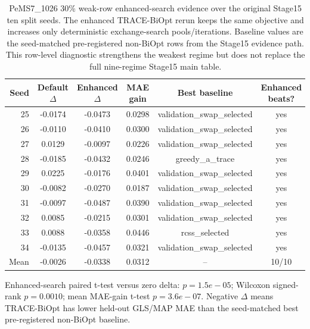 \begin{table}[pos=htbp]
\centering
\caption{PeMS7\_1026 30\% weak-row enhanced-search evidence over the original Stage15 ten split seeds. The enhanced TRACE-BiOpt rerun keeps the same objective and increases only deterministic exchange-search pools/iterations. Baseline values are the seed-matched pre-registered non-BiOpt rows from the Stage15 evidence path. This row-level diagnostic strengthens the weakest regime but does not replace the full nine-regime Stage15 main table.}
\label{tab:trace-biopt-search-probe}
\small
\begin{tabular}{rccccc}
\toprule
Seed & Default $\Delta$ & Enhanced $\Delta$ & MAE gain & Best baseline & Enhanced beats? \\
\midrule
25 & -0.0174 & -0.0473 & 0.0298 & validation\_swap\_selected & yes \\
26 & -0.0110 & -0.0410 & 0.0300 & validation\_swap\_selected & yes \\
27 & 0.0129 & -0.0097 & 0.0226 & validation\_swap\_selected & yes \\
28 & -0.0185 & -0.0432 & 0.0246 & greedy\_a\_trace & yes \\
29 & 0.0225 & -0.0176 & 0.0401 & validation\_swap\_selected & yes \\
30 & -0.0082 & -0.0270 & 0.0187 & validation\_swap\_selected & yes \\
31 & -0.0097 & -0.0487 & 0.0390 & validation\_swap\_selected & yes \\
32 & 0.0085 & -0.0215 & 0.0301 & validation\_swap\_selected & yes \\
33 & 0.0088 & -0.0358 & 0.0446 & rcss\_selected & yes \\
34 & -0.0135 & -0.0457 & 0.0321 & validation\_swap\_selected & yes \\
\midrule
Mean & -0.0026 & -0.0338 & 0.0312 & -- & 10/10 \\
\bottomrule
\end{tabular}
\vspace{2pt}\raggedright\footnotesize Enhanced-search paired t-test versus zero delta: $p=1.5e-05$; Wilcoxon signed-rank $p=0.0010$; mean MAE-gain t-test $p=3.6e-07$. Negative $\Delta$ means TRACE-BiOpt has lower held-out GLS/MAP MAE than the seed-matched best pre-registered non-BiOpt baseline.
\end{table}
